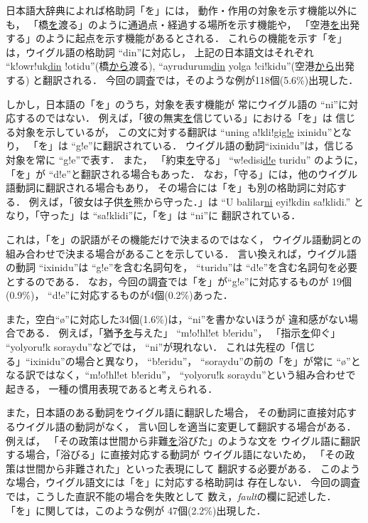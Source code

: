 日本語大辞典\cite{GDIC}によれば格助詞「を」には，
動作・作用の対象を示す機能以外にも，
「橋\underline{を}渡る」のように通過点・経過する場所を示す機能や，
「空港\underline{を}出発する」のように起点を示す機能があるとされる．
これらの機能を示す「を」は，ウイグル語の格助詞 ``din''に対応し，
上記の日本語文はそれぞれ
``k!owr!uk\underline{din} !otidu''(橋\underline{から}渡る), 
``ayrudurum\underline{din} yolga !ci!kidu''(空港\underline{から}出発する)
と翻訳される．
今回の調査では，そのような例が118個(5.6\%)出現した．

しかし，日本語の「を」のうち，対象を表す機能が
常にウイグル語の ``ni''に対応するのではない．
例えば，「彼の無実\underline{を}信じている」における「を」は
信じる対象を示しているが，
この文に対する翻訳は ``uning a!kli!gi\underline{g!e} ixinidu''となり，
「を」は ``g!e''に翻訳されている．
ウイグル語の動詞``ixinidu''は，信じる対象を常に
``g!e''で表す．
また，
「約束\underline{を}守る」 ``w!edisi\underline{d!e} turidu''
のように，「を」が ``d!e''と翻訳される場合もあった．
なお，「守る」には，他のウイグル語動詞に翻訳される場合もあり，
その場合には「を」も別の格助詞に対応する．
例えば，「彼女は子供\underline{を}熊から守った．」は
``U balilar\underline{ni} eyi!kdin sa!klidi.''
となり，「守った」は ``sa!klidi''に，「を」は ``ni''に
翻訳されている．

これは，「を」の訳語がその機能だけで決まるのではなく，
ウイグル語動詞との組み合わせで決まる場合があることを示している．
言い換えれば，ウイグル語の動詞 ``ixinidu''は ``g!e''を含む名詞句を，
``turidu''は ``d!e''を含む名詞句を必要とするのである．
なお，今回の調査では「を」が``g!e''に対応するものが
19個(0.9\%)，
``d!e''に対応するものが4個(0.2\%)あった．

また，空白``\o''に対応した34個(1.6\%)は，``ni''を書かないほうが
違和感がない場合である．
例えば，「猶予\underline{を}与えた」 ``m!o!hl!et b!eridu''，
「指示\underline{を}仰ぐ」 ``yolyoru!k soraydu''などでは，
``ni''が現れない．
これは先程の「信じる」``ixinidu''の場合と異なり，
``b!eridu''， ``soraydu''の前の「を」が常に
``\o''となる訳ではなく，``m!o!hl!et b!eridu''，
``yolyoru!k soraydu''という組み合わせで起きる，
一種の慣用表現であると考えられる．

また，日本語のある動詞をウイグル語に翻訳した場合，
その動詞に直接対応するウイグル語の動詞がなく，
言い回しを適当に変更して翻訳する場合がある．
例えば，
「その政策は世間から非難\underline{を}浴びた」のような文を
ウイグル語に翻訳する場合，「浴びる」に直接対応する動詞が
ウイグル語にないため，
「その政策は世間から非難された」といった表現にして
翻訳する必要がある．
このような場合，ウイグル語文には「を」に対応する格助詞は
存在しない．
今回の調査では，こうした直訳不能の場合を失敗として
数え，{\it fault}の欄に記述した．
「を」に関しては，このような例が
47個(2.2\%)出現した．

